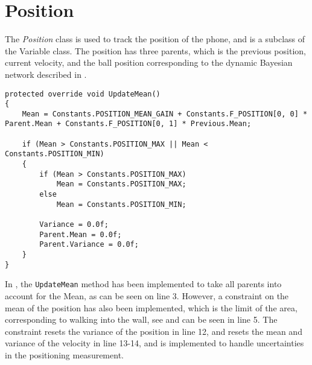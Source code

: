 \section{Position}
The \textit{Position} class is used to track the position of the phone, and is a subclass of the Variable class.
The position has three parents, which is the previous position, current velocity, and the ball position corresponding to the dynamic Bayesian network described in .

\begin{lstlisting}[caption={Update mean method containing constraints for position}, label=lst:PositionConstraint, float=h, style=sharpc]
protected override void UpdateMean()
{
    Mean = Constants.POSITION_MEAN_GAIN + Constants.F_POSITION[0, 0] * Parent.Mean + Constants.F_POSITION[0, 1] * Previous.Mean;

    if (Mean > Constants.POSITION_MAX || Mean < Constants.POSITION_MIN)
    {
        if (Mean > Constants.POSITION_MAX)
            Mean = Constants.POSITION_MAX;
        else
            Mean = Constants.POSITION_MIN;    
        
        Variance = 0.0f;
        Parent.Mean = 0.0f;
        Parent.Variance = 0.0f;
    }
}
\end{lstlisting}

In , the \lstinline$UpdateMean$ method has been implemented to take all parents into account for the Mean, as can be seen on line 3.
However, a constraint on the mean of the position has also been implemented, which is the limit of the area, corresponding to walking into the wall, see  and can be seen in line 5.
The constraint resets the variance of the position in line 12, and resets the mean and variance of the velocity in line 13-14, and is implemented to handle uncertainties in the positioning measurement.